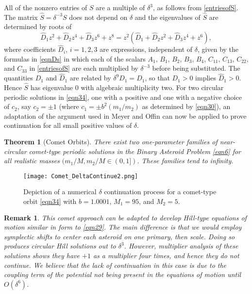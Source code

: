 \documentclass[12pt]{article}
\newtheorem{theorem}{Theorem}
\newtheorem{remark}{Remark}%
\begin{document}
All of the nonzero entries of $S$ are a multiple of $\delta^3$, as follows from \eqref{entriesofS}. The matrix $\hat S = \delta^{-3} S$ does not depend on $\delta$ and the eigenvalues of $\hat S$ are determined by roots of
\[  \hat D_1 z^2 + \hat D_2 z^4 + \hat D_3 z^6 + z^8 = z^2(\hat D_1 + \hat D_2 z^2 + \hat D_3 z^4 + z^6),\]
where coefficients $\hat D_i$, $i=1,2,3$ are expressions, independent of $\delta$, given by the formulas in \eqref{eqnDs} in which each of the scalars $A_1$, $B_1$, $B_2$, $B_3$, $B_4$, $C_{11}$, $C_{13}$, $C_{22}$, and $C_{33}$ in \eqref{entriesofS} are each multiplied by $\delta^{-3}$ before being substituted. The quantities $D_1$ and $\hat D_1$ are related by $\delta^9 \hat D_1 = D_1$, so that $D_1>0$ implies $\hat D_1>0$. Hence $\hat S$ has eigenvalue $0$ with algebraic multiplicity two. For two circular periodic solutions in \eqref{eqn34}, one with a positive and one with a negative choice of $c_2$, say $c_2 = \pm 1$ (where $c_1 = \pm b^2(m_1/m_2)$ as determined by \eqref{eqn30}), an adaptation of the argument used in Meyer and Offin \cite{meyerOffin} can now be applied to prove continuation for all small positive values of $\delta$.




\begin{theorem}[Comet Orbits]\label{thmComets}
There exist two one-parameter families of near-circular comet-type periodic solutions in the Binary Asteroid Problem \eqref{eqn6} for all realistic masses $(m_1/M, m_2/M \in (0,1])$. These families tend to infinity.
\end{theorem}

\begin{figure}[ht]%
\centering
\texttt{[image: Comet\_DeltaContinue2.png]}
\caption{Depiction of a numerical $\delta$ continuation process for a comet-type orbit \eqref{eqn34} with $b = 1.0001$, $M_1 = 95$, and $M_2 = 5$.
}\label{fig4}
\end{figure}

\begin{remark} This comet approach can be adapted to develop Hill-type equations of motion similar in form to \eqref{eqn29}. The main difference is that we would employ symplectic shifts to center each asteroid on one primary, then scale. Doing so produces circular Hill solutions out to $\delta^3$. However, multiplier analysis of these solutions shows they have $+1$ as a multiplier four times, and hence they do not continue. We believe that the lack of continuation in this case is due to the coupling term of the potential not being present in the equations of motion until $O(\delta^6)$.
\end{remark}
\end{document}
